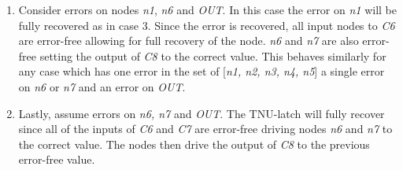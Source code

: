 \begin{enumerate}
	\item Consider errors on nodes \textit{n1}, \textit{n6} and \textit{OUT}. In this case the error on \textit{n1} will be fully recovered as in case 3. Since the error is recovered, all input nodes to \textit{C6} are error-free allowing for full recovery of the node. \textit{n6} and \textit{n7} are also error-free setting the output of \textit{C8} to the correct value. This behaves similarly for any case which has one error in the set of [\textit{n1, n2, n3, n4, n5}] a single error on \textit{n6} or \textit{n7} and an error on \textit{OUT}.
	
	\item Lastly, assume errors on \textit{n6, n7} and \textit{OUT}. The TNU-latch will fully recover since all of the inputs of \textit{C6} and \textit{C7} are error-free driving nodes \textit{n6} and \textit{n7} to the correct value. The nodes then drive the output of \textit{C8} to the previous error-free value.
	
\end{enumerate}

